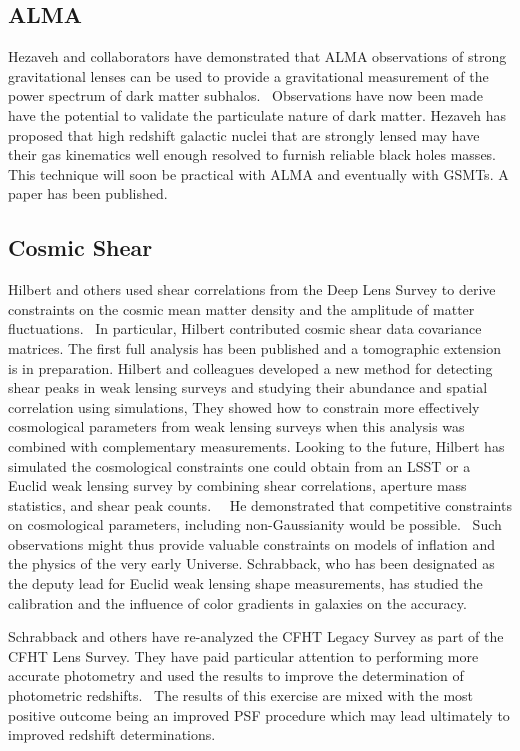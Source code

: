\documentclass[psfig,11pt]{article}
\def\ni{\noindent}
\begin{document}
{\subsection{ALMA}
Hezaveh and collaborators have demonstrated that ALMA observations of  strong gravitational lenses can be used to provide a gravitational measurement of the power spectrum of dark matter subhalos.~\cite{Hezaveh:2014a} Observations have now been made have the potential to validate the particulate nature of dark matter. Hezaveh has proposed that high redshift galactic nuclei that are strongly lensed may have their gas kinematics well enough resolved to furnish reliable black holes masses.~\cite{Hezaveh:2014}  This technique will soon be practical with ALMA and eventually with GSMTs. A paper has been published.

\subsection{Cosmic Shear}

\ni{\bf Weak lensing surveys:}
Hilbert and others used shear correlations from the Deep Lens Survey to derive constraints on the cosmic mean matter density and the amplitude of matter fluctuations.~\cite{Jee:2013} In particular, Hilbert contributed cosmic shear data covariance matrices. The first full analysis has been published and a tomographic extension is in preparation. Hilbert and colleagues developed a new method for detecting shear peaks in weak lensing surveys and studying their abundance and spatial correlation using simulations, They showed how to constrain more effectively cosmological parameters from weak lensing surveys when this analysis was combined with complementary measurements.  Looking to the future, Hilbert has simulated the cosmological constraints one could obtain from an LSST or a Euclid weak lensing survey by combining shear correlations, aperture mass statistics, and shear peak counts.~\cite{Marian:2012}~\cite{Marian:2013} He demonstrated that competitive constraints on cosmological parameters, including non-Gaussianity would be possible.~\cite{Hilbert:2012} Such observations might thus provide valuable constraints on models of inflation and the physics of the very early Universe. Schrabback, who has been designated as the deputy lead for Euclid weak lensing shape measurements, has studied the calibration and the influence of color gradients in galaxies on the accuracy.~\cite{Voigt:2012}

\ni{\bf Improving photometric redshifts:}
Schrabback and others have re-analyzed the CFHT Legacy Survey as part of the CFHT Lens Survey. They have paid particular attention to performing more accurate photometry and used the results to improve the determination of photometric redshifts.~\cite{Hildebrandt:2012} The results of this exercise are mixed with the most positive outcome being an improved PSF procedure which may lead ultimately to improved redshift determinations.

}
\end{document}
